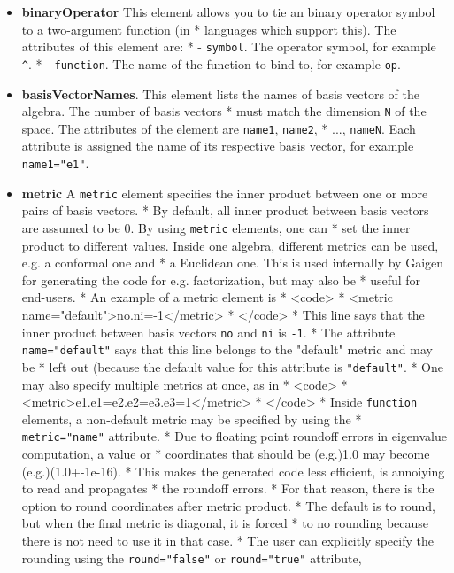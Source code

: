 \documentclass[10pt, a4paper]{article}
\begin{document}
\begin{itemize}
\item {\bf binaryOperator} This element allows you to tie an binary operator symbol to a two-argument function (in
 *     languages which support this). The attributes of this element are:
 *        - {\tt symbol}. The operator symbol, for example {\tt ^}.
 *        - {\tt function}. The name of the function to bind to, for example {\tt op}.
\item {\bf basisVectorNames}. This element lists the names of basis vectors of the algebra. The number of basis vectors
 *     must match the dimension {\tt N} of the space. The attributes of the element are {\tt name1}, {\tt name2}, 
 *     ..., {\tt nameN}. Each attribute is assigned the name of its respective basis vector, for example {\tt name1="e1"}.
\item {\bf metric} A {\tt metric} element specifies the inner product between one or more pairs of basis vectors.
 *     By default, all inner product between basis vectors are assumed to be 0. By using {\tt metric} elements, one can
 *     set the inner product to different values. Inside one algebra, different metrics can be used, e.g. a conformal one and
 *     a Euclidean one. This is used internally by Gaigen for generating the code for e.g. factorization, but may also be
 *     useful for end-users.
 *     An example of a metric element is 
 *     <code>
 *     <metric name="default">no.ni=-1</metric>
 *     </code>
 *     This line says that the inner product between basis vectors {\tt no} and {\tt ni} is {\tt -1}.
 *     The attribute {\tt name="default"} says that this line belongs to the "default" metric and may be
 *     left out (because the default value for this attribute is {\tt "default"}.
 *     One may also specify multiple metrics at once, as in
 *     <code>
 *     <metric>e1.e1=e2.e2=e3.e3=1</metric>
 *     </code>
 *     Inside {\tt function} elements, a non-default metric may be specified by using the 
 *     {\tt metric="name"} attribute.
 *     Due to floating point roundoff errors in eigenvalue computation, a value or
 *     coordinates that should be (e.g.)1.0 may become (e.g.)(1.0+-1e-16).
 *     This makes the generated code less efficient, is annoiying to read and propagates
 *     the roundoff errors.
 *     For that reason, there is the option to round coordinates after metric product.
 *     The default is to round, but when the final metric is diagonal, it is forced
 *     to no rounding because there is not need to use it in that case. 
 *     The user can explicitly specify the rounding using the {\tt round="false"} or {\tt round="true"} attribute,

\end{itemize}
\end{document}
